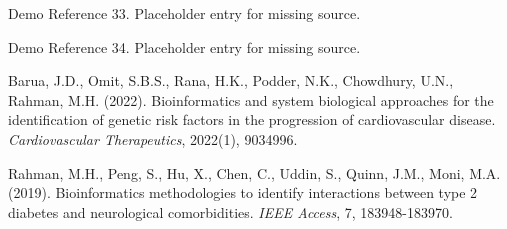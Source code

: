 \documentclass[a4paper,12pt,openbib,oneside]{memoir}
\theoremstyle{plain}
\theoremstyle{plain}
\theoremstyle{plain}
\theoremstyle{definition}
\theoremstyle{plain}
\theoremstyle{plain}
\theoremstyle{plain}
\begin{document}
\begin{thebibliography}{99}
 Demo Reference 33. Placeholder entry for missing source.

 Demo Reference 34. Placeholder entry for missing source.

 Barua, J.D., Omit, S.B.S., Rana, H.K., Podder, N.K., Chowdhury, U.N., Rahman, M.H. (2022). Bioinformatics and system biological approaches for the identification of genetic risk factors in the progression of cardiovascular disease. \textit{Cardiovascular Therapeutics}, 2022(1), 9034996.

 Rahman, M.H., Peng, S., Hu, X., Chen, C., Uddin, S., Quinn, J.M., Moni, M.A. (2019). Bioinformatics methodologies to identify interactions between type 2 diabetes and neurological comorbidities. \textit{IEEE Access}, 7, 183948-183970.

\end{thebibliography}
\end{document}
